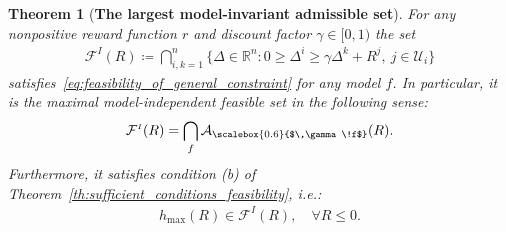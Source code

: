 \documentclass[10pt,leqno]{amsart}
\newcommand{\sml}{\scriptscriptstyle}
\newcommand{\R}{\mathbb{R}}
\newcommand{\U}{\mathcal{U}}
\newcommand{\cost}{r}
\newcommand{\Cost}{R}
\newcommand{\f}{f}
\newcommand{\disc}{\gamma}
\newcommand{\feasset}[1]{\mathcal{A}_{\scalebox{0.6}{$\,\disc\!\f$}}(#1)}
\newcommand{\invset}[1]{\mathcal{F}^{\sml I}(#1)}
\newcommand{\outmap}{h_{\sml \text{max}}}
\newtheorem{theorem}{Theorem}[]
\begin{document}
\begin{theorem}[\textbf{The largest model-invariant admissible set}]\label{th:largest_invariant_set}
    For any nonpositive reward function $\cost$ and discount factor $\disc \in [0, 1)$ the set
    \begin{align}\label{eq:feasset_def}
        \invset{\Cost} \coloneqq \bigcap_{i,k = 1}^n \bigl\{ \Delta \in \R^n : 0 \geq \Delta^i \geq \disc \Delta^k + \Cost^j, ~ j \in \U_i\bigr\} %
    \end{align}
    satisfies~\eqref{eq:feasibility_of_general_constraint} for any model $\f$. In particular, it is the maximal model-independent feasible set in the following sense:
    \begin{align}
        \invset{\Cost} = \bigcap_{\f} \feasset{\Cost}.
    \end{align}
    Furthermore, it satisfies condition (b) of Theorem~\ref{th:sufficient_conditions_feasibility}, i.e.:
    \begin{align}
        \outmap(\Cost) \in \invset{\Cost}, \quad \forall \Cost \leq 0.
    \end{align}
\end{theorem}
\end{document}
